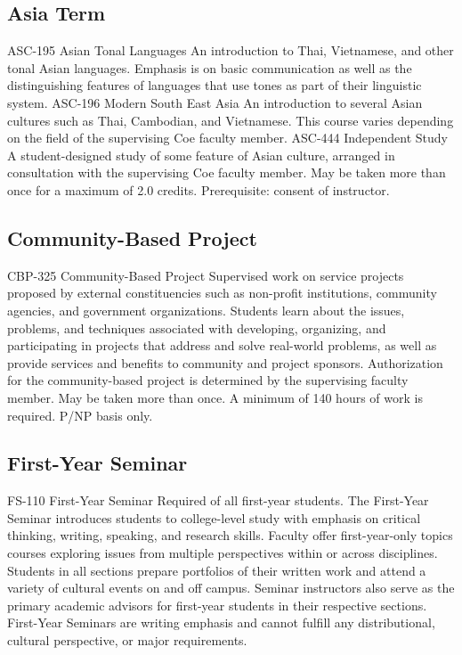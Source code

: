\documentclass[
  letterpaper,
]{scrbook}
\begin{document}
\hypertarget{asia-term-1}{%
\subsection{Asia Term}\label{asia-term-1}}

ASC-195 Asian Tonal Languages An introduction to Thai, Vietnamese, and
other tonal Asian languages. Emphasis is on basic communication as well
as the distinguishing features of languages that use tones as part of
their linguistic system. ASC-196 Modern South East Asia An introduction
to several Asian cultures such as Thai, Cambodian, and Vietnamese. This
course varies depending on the field of the supervising Coe faculty
member. ASC-444 Independent Study A student-designed study of some
feature of Asian culture, arranged in consultation with the supervising
Coe faculty member. May be taken more than once for a maximum of 2.0
credits. Prerequisite: consent of instructor.

\hypertarget{community-based-project}{%
\subsection{Community-Based Project}\label{community-based-project}}

CBP-325 Community-Based Project Supervised work on service projects
proposed by external constituencies such as non-profit institutions,
community agencies, and government organizations. Students learn about
the issues, problems, and techniques associated with developing,
organizing, and participating in projects that address and solve
real-world problems, as well as provide services and benefits to
community and project sponsors. Authorization for the community-based
project is determined by the supervising faculty member. May be taken
more than once. A minimum of 140 hours of work is required. P/NP basis
only.

\hypertarget{first-year-seminar}{%
\subsection{First-Year Seminar}\label{first-year-seminar}}

FS-110 First-Year Seminar Required of all first-year students. The
First-Year Seminar introduces students to college-level study with
emphasis on critical thinking, writing, speaking, and research skills.
Faculty offer first-year-only topics courses exploring issues from
multiple perspectives within or across disciplines. Students in all
sections prepare portfolios of their written work and attend a variety
of cultural events on and off campus. Seminar instructors also serve as
the primary academic advisors for first-year students in their
respective sections. First-Year Seminars are writing emphasis and cannot
fulfill any distributional, cultural perspective, or major requirements.
\end{document}
